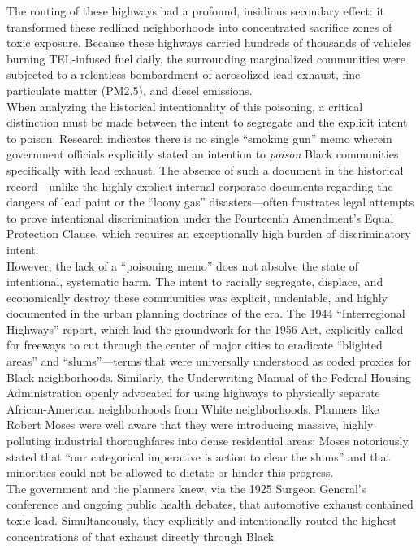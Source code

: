 \documentclass[
]{article}
\begin{document}
The routing of these highways had a profound, insidious secondary
effect: it transformed these redlined neighborhoods into concentrated
sacrifice zones of toxic exposure. Because these highways carried
hundreds of thousands of vehicles burning TEL-infused fuel daily, the
surrounding marginalized communities were subjected to a relentless
bombardment of aerosolized lead exhaust, fine particulate matter
(PM2.5), and diesel emissions.\\
When analyzing the historical intentionality of this poisoning, a
critical distinction must be made between the intent to segregate and
the explicit intent to poison. Research indicates there is no single
``smoking gun'' memo wherein government officials explicitly stated an
intention to \emph{poison} Black communities specifically with lead
exhaust. The absence of such a document in the historical
record---unlike the highly explicit internal corporate documents
regarding the dangers of lead paint or the ``loony gas''
disasters---often frustrates legal attempts to prove intentional
discrimination under the Fourteenth Amendment's Equal Protection Clause,
which requires an exceptionally high burden of discriminatory intent.\\
However, the lack of a ``poisoning memo'' does not absolve the state of
intentional, systematic harm. The intent to racially segregate,
displace, and economically destroy these communities was explicit,
undeniable, and highly documented in the urban planning doctrines of the
era. The 1944 ``Interregional Highways'' report, which laid the
groundwork for the 1956 Act, explicitly called for freeways to cut
through the center of major cities to eradicate ``blighted areas'' and
``slums''---terms that were universally understood as coded proxies for
Black neighborhoods. Similarly, the Underwriting Manual of the Federal
Housing Administration openly advocated for using highways to physically
separate African-American neighborhoods from White neighborhoods.
Planners like Robert Moses were well aware that they were introducing
massive, highly polluting industrial thoroughfares into dense
residential areas; Moses notoriously stated that ``our categorical
imperative is action to clear the slums'' and that minorities could not
be allowed to dictate or hinder this progress.\\
The government and the planners knew, via the 1925 Surgeon General's
conference and ongoing public health debates, that automotive exhaust
contained toxic lead. Simultaneously, they explicitly and intentionally
routed the highest concentrations of that exhaust directly through Black
\end{document}

